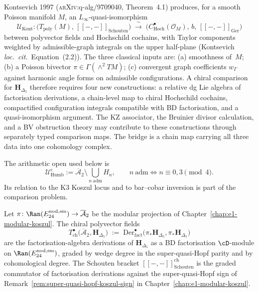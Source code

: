 Kontsevich 1997 (\textsc{arXiv}:q-alg/9709040, Theorem~4.1) produces,
for a smooth Poisson manifold $M$, an $L_\infty$-quasi-isomorphism
\[
\mathcal U_{\mathrm{Kont}}\colon
\bigl(T_{\mathrm{poly}}(M),\,[\![-,-]\!]_{\mathrm{Schouten}}\bigr)
\;\xrightarrow{\;\sim\;}\;
\bigl(C^\bullet_{\mathrm{Hoch}}(\mathcal O_M),\,
b,\,[\![-,-]\!]_{\mathrm{Ger}}\bigr)
\]
between polyvector fields and Hochschild cochains, with Taylor
components weighted by admissible-graph integrals on the upper
half-plane (Kontsevich \textit{loc.~cit.}\ Equation~(2.2)). The
three classical inputs are: (a) smoothness of~$M$; (b) a Poisson
bivector $\pi\in\Gamma(\wedge^2 TM)$; (c) convergent graph
coefficients $w_\Gamma$ against harmonic angle forms on admissible
configurations.  A chiral comparison for $\mathbf H_{\Delta_5}$
therefore requires four new constructions: a relative dg Lie algebra
of factorisation derivations, a chain-level map to chiral Hochschild
cochains, compactified configuration integrals compatible with BD
factorisation, and a quasi-isomorphism argument.  The KZ associator,
the Bruinier divisor calculation, and a BV obstruction theory may
contribute to these constructions through separately typed comparison
maps.  The bridge is a chain map carrying all three data into one
cohomology complex.

The arithmetic open used below is
\[
 \mathcal U_{\mathrm{Humb}}^{\mathrm c}
 :=\overline{\mathcal A}_2\setminus
   \bigcup_{n\ \mathrm{adm}}H_n,
 \qquad n\ \mathrm{adm}\iff n\equiv0,3\pmod4.
\]
Its relation to the K3 Koszul locus and to bar--cobar inversion is part
of the comparison problem.

\begin{definition}
\label{def:chiral-polyvector-fields-A2}
%
Let $\pi\colon\Ran(E^{\mathrm{nod,sm}}_{24})\to\overline{\mathcal A}_2$
be the modular projection of
Chapter~\ref{chap:e1-modular-koszul}. The chiral polyvector fields
\[
T^\bullet_{\mathrm{ch}}
\bigl(\overline{\mathcal A}_2,\mathbf H_{\Delta_5}\bigr)
\;:=\;
\mathrm{Der}^\bullet_{\mathrm{fact}}
\bigl(\pi_*\mathbf H_{\Delta_5},
\pi_*\mathbf H_{\Delta_5}\bigr)
\]
are the factorisation-algebra derivations of $\mathbf H_{\Delta_5}$
as a BD factorisation $\cD$-module on
$\Ran(E^{\mathrm{nod,sm}}_{24})$, graded by wedge degree in the
super-quasi-Hopf parity and by cohomological degree. The Schouten
bracket $[\![-,-]\!]_{\mathrm{Schouten}}^{\mathrm{ch}}$ is the graded
commutator of factorisation derivations against the super-quasi-Hopf
sign of Remark~\ref{rem:super-quasi-hopf-koszul-sign} in
Chapter~\ref{chap:e1-modular-koszul}.
\end{definition}

